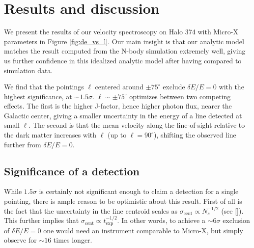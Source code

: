 \documentclass[aps,prl,10pt,twocolumn,superscriptaddress,showpacs]{revtex4-1}
\begin{document}
\section{Results and discussion}
\label{sec:results}

We present the results of our velocity spectroscopy on Halo 374 with Micro-X parameters in Figure \ref{fig:de_vs_l}. 
Our main insight is that our analytic model matches the result computed from the N-body simulation
extremely well, giving us further confidence in this idealized analytic model after having compared
to simulation data.

We find that the pointings $\ell$ centered around $\pm75^\circ$ exclude $\delta E/E=0$ with 
the highest significance, at $\sim 1.5\sigma$. $\ell\sim\pm75^\circ$ optimizes between two
competing effects. The first is the higher J-factor, hence higher
photon flux, nearer the Galactic center, giving a smaller uncertainty in the energy of a line
detected at small $\ell$. The second is that the mean velocity along the line-of-sight relative to
the dark matter increases with $\ell$ (up to $\ell=90^\circ$), shifting the observed line further
from $\delta E/E=0$.

\subsection{Significance of a detection}
While $1.5\sigma$ is certainly not significant enough to claim a detection for a single pointing, there is ample reason to
be optimistic about this result. First of all is the fact that the uncertainty in the line centroid
scales as $\sigma_{\mathrm{cent}} \propto N_s^{-1/2}$ (see \eqref{}). This further implies that
$\sigma_{\mathrm{cent}} \propto t_\mathrm{exp}^{-1/2}$. In other words, to achieve a $\sim 6\sigma$
exclusion of $\delta E/E=0$ one would need an instrument comparable to Micro-X, but simply observe
for $\sim 16$ times longer. 

\end{document}
